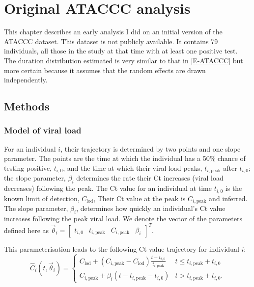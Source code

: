 \documentclass[thesis.tex]{subfiles}
\begin{document}
\chapter{Original ATACCC analysis} \label{ATACCC:sec:original-analysis}

This chapter describes an early analysis I did on an initial version of the ATACCC dataset.
This dataset is not publicly available.
It contains 79 individuals, all those in the study at that time with at least one positive test.
The duration distribution estimated is very similar to that in \cref{E-ATACCC} but more certain because it assumes that the random effects are drawn independently.

\section{Methods}

\subsection{Model of viral load}

For an individual $i$, their trajectory is determined by two points and one slope parameter.
The points are the time at which the individual has a 50\% chance of testing positive, $t_{i,0}$, and the time at which their viral load
peaks, $t_{i,\text{peak}}$ after $t_{i,0}$; the slope parameter, $\beta_i$ determines the rate their Ct increases (viral load decreases) following the peak.
The Ct value for an individual at time $t_{i,0}$ is the known limit of detection, $C_\text{lod}$,
Their Ct value at the peak is $C_{i,\text{peak}}$ and inferred.
The slope parameter, $\beta_i$, determines how quickly an individual's Ct value increases following the peak viral load.
We denote the vector of the parameters defined here as $\vec\theta_i = \begin{bmatrix} t_{i,0} & t_{i,\text{peak}} & C_{i,\text{peak}} &  \beta_i \end{bmatrix}^T$.

This parameterisation leads to the following Ct value trajectory for individual $i$:
$$
\hat{C}_i(t, \vec\theta_i) = \begin{cases}
  C_{\text{lod}} + (C_{i,\text{peak}} - C_{\text{lod}}) \frac{t - t_{i,0}}{t_{i,\text{peak}}}
    &t \leq t_{i,\text{peak}} + t_{i,0} \\
  C_{i,\text{peak}} + \beta_i (t - t_{i,\text{peak}} - t_{i,0})
    &t > t_{i,\text{peak}} + t_{i,0}.
\end{cases}
$$
\end{document}
